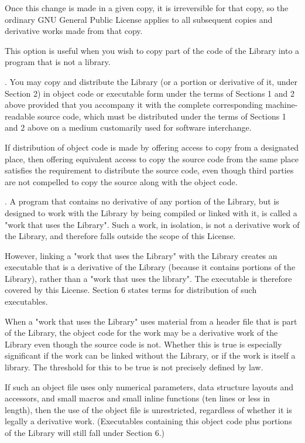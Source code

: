Once this change is made in a given copy, it is irreversible for that copy, so the ordinary GNU General Public License applies to all subsequent copies and derivative works made from that copy. 

This option is useful when you wish to copy part of the code of the Library into a program that is not a library. 

. You may copy and distribute the Library (or a portion or derivative of it, under Section 2) in object code or executable form under the terms of Sections 1 and 2 above provided that you accompany it with the complete corresponding machine-readable source code, which must be distributed under the terms of Sections 1 and 2 above on a medium customarily used for software interchange. 

If distribution of object code is made by offering access to copy from a designated place, then offering equivalent access to copy the source code from the same place satisfies the requirement to distribute the source code, even though third parties are not compelled to copy the source along with the object code. 

. A program that contains no derivative of any portion of the Library, but is designed to work with the Library by being compiled or linked with it, is called a "work that uses the Library". Such a work, in isolation, is not a derivative work of the Library, and therefore falls outside the scope of this License. 

However, linking a "work that uses the Library" with the Library creates an executable that is a derivative of the Library (because it contains portions of the Library), rather than a "work that uses the library". The executable is therefore covered by this License. Section 6 states terms for distribution of such executables. 

When a "work that uses the Library" uses material from a header file that is part of the Library, the object code for the work may be a derivative work of the Library even though the source code is not. Whether this is true is especially significant if the work can be linked without the Library, or if the work is itself a library. The threshold for this to be true is not precisely defined by law. 

If such an object file uses only numerical parameters, data structure layouts and accessors, and small macros and small inline functions (ten lines or less in length), then the use of the object file is unrestricted, regardless of whether it is legally a derivative work. (Executables containing this object code plus portions of the Library will still fall under Section 6.) 

